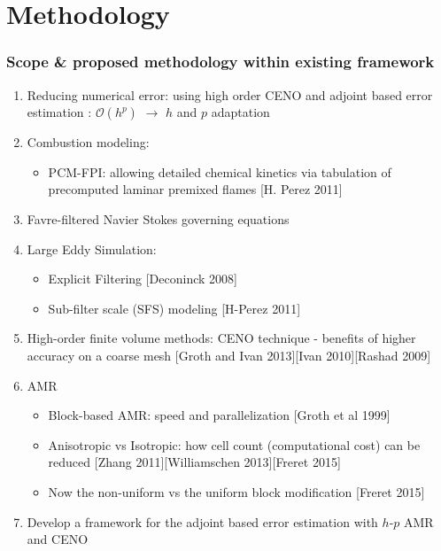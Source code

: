 \documentclass{beamer}
\begin{document}
\section[Methodology]{Methodology}
\begin{frame}%
\frametitle{Scope \& proposed methodology within existing framework}
\scriptsize
\vspace{-10pt}
\begin{enumerate}[1.]
\item Reducing numerical error: using high order CENO and adjoint based error estimation : {$\mathcal{O}(h^p)$} $\rightarrow$ $h$ and $p$ adaptation

\item Combustion modeling:
  \begin{itemize}
   \tiny
   \item PCM-FPI: allowing detailed chemical kinetics via tabulation of precomputed laminar premixed flames [H. Perez 2011]
   \end{itemize}  


\item Favre-filtered Navier Stokes governing equations

\item Large Eddy Simulation:
  \begin{itemize}
  \tiny
   \item Explicit Filtering [Deconinck 2008]
   \item Sub-filter scale (SFS) modeling [H-Perez 2011]
  \end{itemize}

\item High-order finite volume methods: CENO technique - benefits of higher accuracy on a coarse mesh [Groth and Ivan 2013][Ivan 2010][Rashad 2009]


\item AMR
   \begin{itemize}
   \tiny
   \item Block-based AMR: speed and parallelization [Groth et al 1999]
   \item Anisotropic vs Isotropic: how cell count (computational cost) can be reduced [Zhang 2011][Williamschen 2013][Freret 2015]
   \item Now the non-uniform vs the uniform block modification [Freret 2015]
   \end{itemize}
   
\item Develop a framework for the adjoint based error estimation with $h$-$p$ AMR and CENO
\end{enumerate}
\end{frame}
\end{document}
